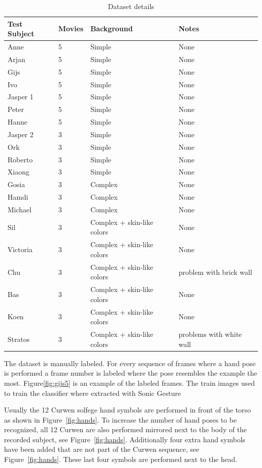 \begin{table}
\centering
\begin{tabular}{llll}
\hline\hline
	Test Subject & Movies & Background & Notes \\
\hline
	Anne     & 5 & Simple & None \\
	Arjan    & 5 & Simple & None \\
	Gijs     & 5 & Simple & None \\
	Ivo      & 5 & Simple & None \\
	Jasper 1 & 5 & Simple & None \\
	Peter    & 5 & Simple & None \\
	Hanne    & 5 & Simple & None \\
	Jasper 2 & 3 & Simple & None \\
	Ork      & 3 & Simple & None \\
	Roberto  & 3 & Simple & None \\
	Xiaong   & 3 & Simple & None \\
	\hline			
	Gosia    & 3 & Complex & None \\
	Hamdi    & 3 & Complex & None \\
	Michael  & 3 & Complex & None \\
	Sil      & 3 & Complex + skin-like colors & None \\
	Victoria & 3 & Complex + skin-like colors & None \\
	Chu      & 3 & Complex + skin-like colors & problem with brick wall \\
	\hline	
	Bas      & 3 & Complex + skin-like colors & None \\
	Koen     & 3 & Complex + skin-like colors & None \\
	Stratos  & 3 & Complex + skin-like colors & problems with white wall \\
\hline
\end{tabular}
\caption{Dataset details}
\end{table}

The dataset is manually labeled. For every sequence of frames where a hand pose is performed a frame number is labeled where the pose resembles the example the most. Figure\ref{fig:gijs5} is an example of the labeled frames. The train images used to train the classifier where extracted with Sonic Gesture

Usually the 12 Curwen solfege hand symbols are performed in front of the torso as shown in Figure~\ref{fig:hands}. To increase the number of hand poses to be recognized, all 12 Curwen are also performed mirrored next to the body of the recorded subject, see Figure~\ref{fig:hands}. Additionally four extra hand symbols have been added that are not part of the Curwen sequence, see Figure~\ref{fig:hands}. These last four symbols are performed next to the head.

